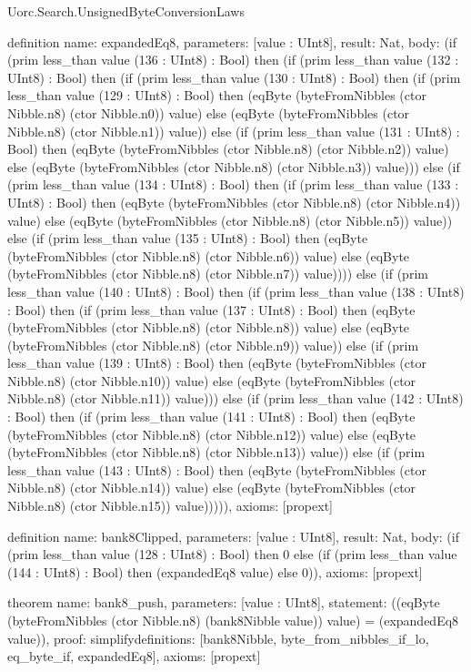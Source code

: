 \begin{lexlean}{Uorc.Search.UnsignedByteConversionLaws}
\begin{semanticmodule}
definition{
  name: expandedEq8,
  parameters: [value : UInt8],
  result: Nat,
  body: (if (prim less_than value (136 : UInt8) : Bool) then (if (prim less_than value (132 : UInt8) : Bool) then (if (prim less_than value (130 : UInt8) : Bool) then (if (prim less_than value (129 : UInt8) : Bool) then (eqByte (byteFromNibbles (ctor Nibble.n8) (ctor Nibble.n0)) value) else (eqByte (byteFromNibbles (ctor Nibble.n8) (ctor Nibble.n1)) value)) else (if (prim less_than value (131 : UInt8) : Bool) then (eqByte (byteFromNibbles (ctor Nibble.n8) (ctor Nibble.n2)) value) else (eqByte (byteFromNibbles (ctor Nibble.n8) (ctor Nibble.n3)) value))) else (if (prim less_than value (134 : UInt8) : Bool) then (if (prim less_than value (133 : UInt8) : Bool) then (eqByte (byteFromNibbles (ctor Nibble.n8) (ctor Nibble.n4)) value) else (eqByte (byteFromNibbles (ctor Nibble.n8) (ctor Nibble.n5)) value)) else (if (prim less_than value (135 : UInt8) : Bool) then (eqByte (byteFromNibbles (ctor Nibble.n8) (ctor Nibble.n6)) value) else (eqByte (byteFromNibbles (ctor Nibble.n8) (ctor Nibble.n7)) value)))) else (if (prim less_than value (140 : UInt8) : Bool) then (if (prim less_than value (138 : UInt8) : Bool) then (if (prim less_than value (137 : UInt8) : Bool) then (eqByte (byteFromNibbles (ctor Nibble.n8) (ctor Nibble.n8)) value) else (eqByte (byteFromNibbles (ctor Nibble.n8) (ctor Nibble.n9)) value)) else (if (prim less_than value (139 : UInt8) : Bool) then (eqByte (byteFromNibbles (ctor Nibble.n8) (ctor Nibble.n10)) value) else (eqByte (byteFromNibbles (ctor Nibble.n8) (ctor Nibble.n11)) value))) else (if (prim less_than value (142 : UInt8) : Bool) then (if (prim less_than value (141 : UInt8) : Bool) then (eqByte (byteFromNibbles (ctor Nibble.n8) (ctor Nibble.n12)) value) else (eqByte (byteFromNibbles (ctor Nibble.n8) (ctor Nibble.n13)) value)) else (if (prim less_than value (143 : UInt8) : Bool) then (eqByte (byteFromNibbles (ctor Nibble.n8) (ctor Nibble.n14)) value) else (eqByte (byteFromNibbles (ctor Nibble.n8) (ctor Nibble.n15)) value))))),
  axioms: [propext]
}

definition{
  name: bank8Clipped,
  parameters: [value : UInt8],
  result: Nat,
  body: (if (prim less_than value (128 : UInt8) : Bool) then 0 else (if (prim less_than value (144 : UInt8) : Bool) then (expandedEq8 value) else 0)),
  axioms: [propext]
}

theorem{
  name: bank8_push,
  parameters: [value : UInt8],
  statement: ((eqByte (byteFromNibbles (ctor Nibble.n8) (bank8Nibble value)) value) = (expandedEq8 value)),
  proof: simplify{definitions: [bank8Nibble, byte_from_nibbles_if_lo, eq_byte_if, expandedEq8]},
  axioms: [propext]
}


\end{semanticmodule}
\end{lexlean}
